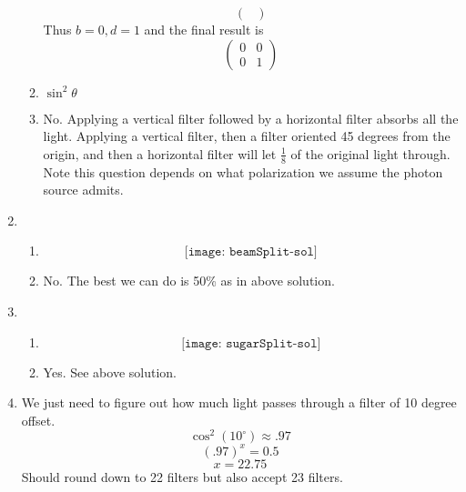 \documentclass[12pt]{article}
\begin{document}
\begin{enumerate}[font=\bfseries]
\begin{enumerate}
\[\begin{pmatrix}
        \end{pmatrix}
        \]
        Thus $b = 0, d = 1$ and the final result is
        \[\begin{pmatrix}
                0 & 0 \\
                0 & 1
                \end{pmatrix}\]
        \item  $\sin^2{\theta}$
        \item No. Applying a vertical filter followed by a horizontal filter absorbs all the light. Applying a vertical filter, then a filter oriented 45 degrees from the origin, and then a horizontal filter will let $\frac{1}{8}$ of the original light through. Note this question depends on what polarization we assume the photon source admits. 
    \end{enumerate}
    \item \begin{enumerate}
        \item \[\texttt{[image: beamSplit-sol]}\]
        \item No. The best we can do is 50\% as in above solution.
    \end{enumerate}
    \item \begin{enumerate}
        \item \[\texttt{[image: sugarSplit-sol]}\]
        \item Yes. See above solution.
    \end{enumerate}
    
    \item 
    We just need to figure out how much light passes through a filter of 10 degree offset.
    \[\cos^2({10^{\circ}}) \approx .97 \]
            \[(.97)^x = 0.5\]
            \[x = 22.75\]
            Should round down to 22 filters but also accept 23 filters.
\end{enumerate}
\end{document}
